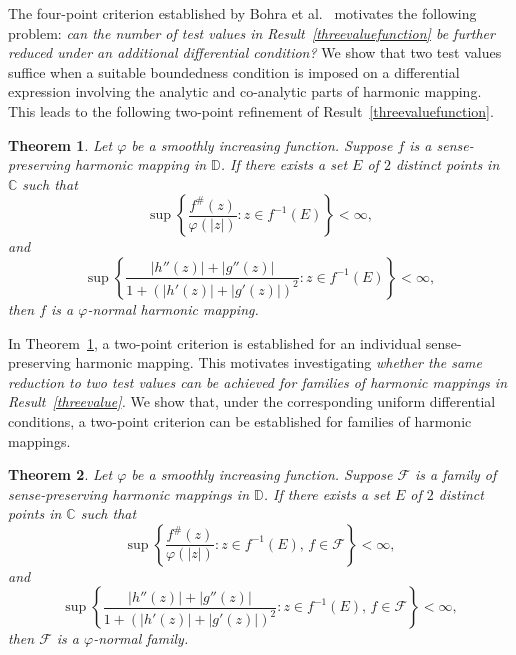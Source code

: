 \documentclass[11pt, reqno]{amsart}
\numberwithin{equation}{section}
\theoremstyle{definition}
\theoremstyle{remark}
\theoremstyle{plain}
\newtheorem{theorem}{Theorem}[section]
\begin{document}
The four-point criterion established by Bohra et al.~\cite[Theorem 1.6]{Bohra}
motivates the following problem: {\it can the number 
of test values in Result~\ref{threevaluefunction}
 be further reduced under an additional differential condition?}
 We show that two test values suffice when a suitable boundedness
condition is imposed on a differential expression involving the analytic 
and co-analytic parts of harmonic mapping. This leads to the
following two-point refinement of Result~\ref{threevaluefunction}.
\begin{theorem}\label{twovaluefunction}
  Let $\varphi$ be a smoothly increasing function. 
  Suppose $f$ is a 
   sense-preserving harmonic mapping in $\mathbb{D}$.
    If there exists a set $E$ of $2$ 
   distinct points in $\mathbb{C}$ such that
\begin{equation}\label{eq:1twovaluefunction}
\sup\left\{
\frac{f^\#(z)}{\varphi(|z|)}
:
z\in f^{-1}(E)
\right\}
<\infty,
\end{equation}
and
\begin{equation}\label{eq:2twovaluefunction}
\sup\left\{
\frac{|h''(z)|+|g''(z)|}
{1+\left(|h'(z)|+|g'(z)|\right)^2}
:
z\in f^{-1}(E)
\right\}
<\infty,
\end{equation}
then $f$ is a $\varphi$-normal harmonic mapping.
\end{theorem}

In Theorem~\ref{twovaluefunction}, a two-point criterion is 
 established for an individual sense-preserving harmonic mapping. 
This motivates investigating {\it whether the same reduction to two 
test values can be achieved for families of harmonic mappings in 
 Result~\ref{threevalue}.} We show that, under the corresponding 
uniform differential conditions, a two-point criterion can be 
established for families of harmonic mappings.
 \begin{theorem}\label{twovaluefamily}
  Let $\varphi$ be a smoothly increasing function. 
  Suppose $\mathcal{F}$ is
   a family of sense-preserving harmonic mappings in 
   $\mathbb{D}$.
If there exists a set $E$ of $2$ distinct points 
in $\mathbb{C}$ such that
\begin{equation}\label{eq:1twovaluefamily}
\sup\left\{
\frac{f^\#(z)}{\varphi(|z|)}
:
z\in f^{-1}(E), \, f \in \mathcal{F}
\right\}
<\infty,
\end{equation}
and
\begin{equation}\label{eq:2twovaluefamily}
\sup\left\{
\frac{|h''(z)|+|g''(z)|}
{1+\left(|h'(z)|+|g'(z)|\right)^2}
:
z\in f^{-1}(E), \, f \in \mathcal{F}
\right\}
<\infty,
\end{equation}
then $\mathcal{F}$ is a $\varphi$-normal family.
\end{theorem}
\end{document}
